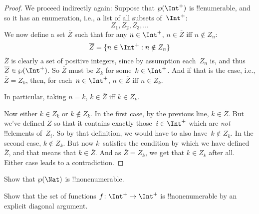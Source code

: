 \documentclass[../../../include/open-logic-section]{subfiles}
\begin{document}
\begin{proof}

We proceed indirectly again: Suppose that $\Pow{\Int^+}$ is
!!{enumerable}, and so it has an enumeration, i.e., a list of all
subsets of~$\Int^+$:
\[
Z_{1}, Z_{2}, Z_{3}, \dots
\]
We now define a set $\overline{Z}$ such that for any $n \in \Int^+$,
$n \in \overline{Z}$ iff $n \notin Z_{n}$:
\[
\overline{Z} = \Setabs{n \in \Int^+}{n \notin Z_n}
\]
$\overline{Z}$ is clearly a set of positive integers, since by
assumption each~$Z_n$ is, and thus $\overline{Z} \in \Pow{\Int^+}$. So
$\overline{Z}$ must be $Z_k$ for some~$k \in \Int^+$. And if that is
the case, i.e., $\overline{Z} = Z_k$, then, for each~$n \in \Int^+$,
$n \in \overline{Z}$ iff $n \in Z_k$.

In particular, taking $n=k$, $k \in \overline{Z}$ iff $k \in Z_k$.

Now either $k \in Z_{k}$ or $k \notin Z_{k}$. In the first case, by
the previous line, $k \in \overline{Z}$. But we've defined
$\overline{Z}$ so that it contains exactly those~$i \in \Int^+$ which
are \emph{not} !!{element}s of~$Z_i$. So by that definition, we would
have to also have~$k \notin Z_k$. In the second case, $k \notin Z_k$.
But now $k$~satisfies the condition by which we have
defined~$\overline{Z}$, and that means that $k \in \overline{Z}$. And
as $\overline{Z} = Z_k$, we get that $k \in Z_k$ after all. Either
case leads to a contradiction.
\end{proof}

\begin{prob}
Show that $\Pow{\Nat}$ is !!{nonenumerable}.
\end{prob}

\begin{prob}
Show that the set of functions $f \colon \Int^+ \to \Int^+$ is
!!{nonenumerable} by an explicit diagonal argument.
\end{prob}
\end{document}
